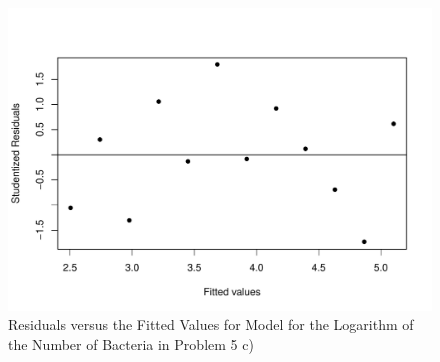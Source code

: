 \begin{solution}{2.22}
\begin{enumerate}
\begin{figure}
\begin{center}
\begin{knitrout}
\color{fgcolor}
\includegraphics[width=\maxwidth]{figure/unnamed-chunk-47-1}

\end{knitrout}
\end{center}
\caption{Residuals versus the Fitted Values for Model for the Logarithm of the Number of Bacteria in Problem 5 c)}
\label{fig:simple:bact7}
\end{figure}

\end{enumerate}
\end{solution}

